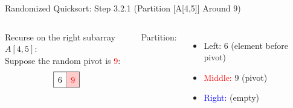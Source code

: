 \begin{frame}{Randomized Quicksort: Step 3.2.1 (Partition [A[4,5]] Around 9)}
  \begin{columns}[t]
    Recurse on the right subarray $A[4,5]$:
    \\[0.5em]

    Suppose the random pivot is \textcolor{red}{9}:
    \[
      \renewcommand{\arraystretch}{1.5}
      \begin{array}{|c|c|}
        \hline
        6 & \cellcolor{red!20}\textcolor{red}{9} \\
        \hline
      \end{array}
    \]

    Partition:
    \begin{itemize}
      \item \textcolor{green!60!black}{Left:} 6 (element before pivot)
      \item \textcolor{red}{Middle:} 9 (pivot)
      \item \textcolor{blue}{Right:} (empty)
    \end{itemize}
    \pause
    \begin{minipage}[t]{\linewidth}
      \vspace{0pt} %
      \begin{center}


\end{center}
\end{minipage}
\end{columns}
\end{frame}
